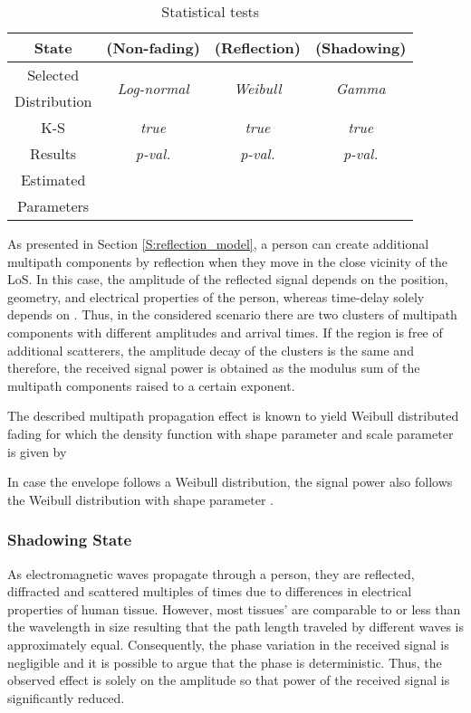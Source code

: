 \documentclass[journal, 10pt, twocolumn, balance]{IEEEtran}
\begin{document}
\begin{table}[!t]
    \caption{Statistical tests} \centering \renewcommand{\arraystretch}{1.15}\begin{tabular}{|c||c|c|c|}
	\hline\hline
	State &  (Non-fading) &  (Reflection) &  (Shadowing) \\
	\hline
	Selected & \multirow{2}{*}{\emph{Log-normal}} & \multirow{2}{*}{\emph{Weibull}} & \multirow{2}{*}{\emph{Gamma}} \\
	Distribution & & &  \\
	\hline
	K-S &  \emph{true} &  \emph{true}  &  \emph{true}  \\
	Results & \emph{p-val.}  & \emph{p-val.}  & \emph{p-val.}  \\
	\hline
	Estimated &  &  &  \\
	Parameters &  &  &  \\
	\hline
        \end{tabular}
        \label{table:statistical_tests} \end{table}


As presented in Section \ref{S:reflection_model}, a person can create additional multipath components by reflection when they move in the close vicinity of the LoS. In this case, the amplitude of the reflected signal depends on the position, geometry, and electrical properties of the person, whereas time-delay  solely depends on . Thus, in the considered scenario there are two clusters of multipath components with different amplitudes and arrival times. If the region is free of additional scatterers, the amplitude decay of the clusters is the same and therefore, the received signal power is obtained as the modulus sum of the multipath components raised to a certain exponent.


The described multipath propagation effect is known to yield Weibull distributed fading  \cite{Yacoub2002, Sagias2005} for which the density function with shape parameter  and scale parameter  is given by

In case the envelope follows a Weibull distribution, the signal power also follows the Weibull distribution with shape parameter  \cite[p. 26]{Simon2005}. 


\subsubsection{Shadowing State}

As electromagnetic waves propagate through a person, they are reflected, diffracted and scattered multiples of times due to differences in electrical properties of human tissue. However, most tissues' are comparable to or less than the wavelength in size resulting that the path length traveled by different waves is approximately equal. Consequently, the phase variation in the received signal is negligible and it is possible to argue that the phase is deterministic. Thus, the observed effect is solely on the amplitude so that power of the received signal is significantly reduced.
 
\end{document}
